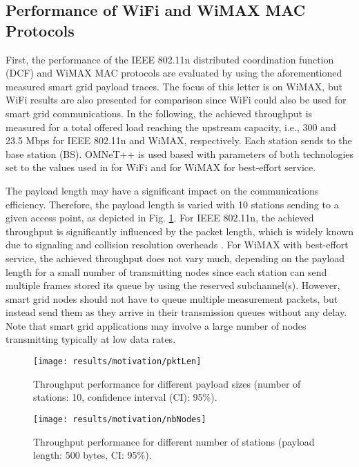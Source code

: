 \documentclass[journal,10pt,draftclsnofoot,onecolumn]{IEEEtran}
\begin{document}
\subsection{Performance of WiFi and WiMAX MAC Protocols}
First, the performance of the IEEE 802.11n distributed coordination function (DCF) and WiMAX MAC protocols are evaluated by using the aforementioned measured smart grid payload traces. The focus of this letter is on WiMAX, but WiFi results are also presented for comparison since WiFi could also be used for smart grid communications. In the following, the achieved throughput is measured for a total offered load reaching the upstream capacity, i.e., 300 and 23.5 Mbps for IEEE 802.11n and WiMAX, respectively. Each station sends to the base station (BS). OMNeT++ is used based with parameters of both technologies set to the values used in \cite{wcncWiFi} for WiFi and \cite{wimaxPerfEval} for WiMAX for best-effort service.

The payload length may have a significant impact on the communications efficiency. Therefore, the payload length is varied with 10 stations sending to a given access point, as depicted in Fig. \ref{fig:motivationPktLen}. For IEEE 802.11n, the achieved throughput is significantly influenced by the packet length, which is widely known due to signaling and collision resolution overheads \cite{wifiNano}. For WiMAX with best-effort service, the achieved throughput does not vary much, depending on the payload length for a small number of transmitting nodes since each station can send multiple frames stored its queue by using the reserved subchannel(s). However, smart grid nodes should not have to queue multiple measurement packets, but instead send them as they arrive in their transmission queues without any delay. Note that smart grid applications may involve a large number of nodes transmitting typically at low data rates.
\begin{figure}
\centering
\texttt{[image: results/motivation/pktLen]}
\caption{Throughput performance for different payload sizes (number of stations: 10, confidence interval (CI): 95\%).}
\label{fig:motivationPktLen}
\end{figure}
\begin{figure}
\centering
\texttt{[image: results/motivation/nbNodes]}
\caption{Throughput performance for different number of stations (payload length: 500 bytes, CI: 95\%).}
\label{fig:motivationNbNodes}
\end{figure}
\end{document}
